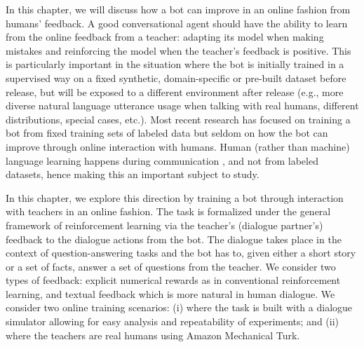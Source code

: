 In this chapter, we will discuss how a bot can improve in an online fashion from humans' feedback. 
A good conversational agent 
should have the ability to learn from the online feedback from a teacher: adapting its model when making mistakes and reinforcing the model when the teacher's feedback is positive.
This is particularly important in the situation where the bot is initially trained in a supervised way on a fixed synthetic, domain-specific or pre-built dataset before release, but will be exposed to
a different environment after release
 (e.g.,
 more diverse natural language utterance usage when talking with real humans, different distributions, special cases, etc.).  Most recent research
has focused on training a bot
from fixed training sets of labeled data but seldom on how the bot can
improve through online interaction with humans.
Human (rather than machine) language learning happens during communication \citep{bassiri2011interactional,werts1995instructive},
and not from labeled datasets, hence making this an important subject to study.


In this chapter, we explore this direction by
 training a bot through interaction with teachers in an online fashion.
 The task is formalized under the general framework of reinforcement learning
via the teacher's (dialogue partner's) feedback to the dialogue actions from the bot.
 The dialogue takes place in the context of question-answering tasks and the bot has to, given either a short story or a set of facts, answer a set of questions from the teacher.
We consider two types of feedback: explicit numerical rewards as in conventional
reinforcement learning, and textual feedback which is more natural in human dialogue.
We consider two online training scenarios:
(i) where the task is built with a dialogue simulator allowing for easy analysis and repeatability
of experiments; and (ii) where the teachers are real humans using Amazon Mechanical Turk.

